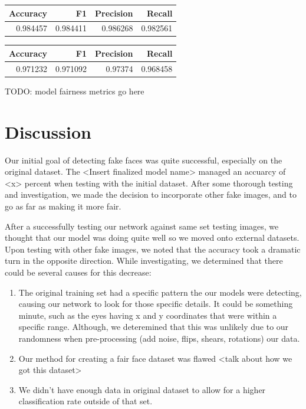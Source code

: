 \documentclass[11pt, letterpaper]{article}
\newenvironment{Figure}
  {\par\medskip\noindent\minipage{\linewidth}}
  {\endminipage\par\medskip}
\providecommand{\tightlist}{%
  \setlength{\itemsep}{0pt}\setlength{\parskip}{0pt}
}
\begin{document}
\begin{multicols}{2}
  \begin{Figure}
    \centering
    \label{vgg10-combined-metrics}
    \begin{tabular}{rrrr}
    \toprule
    Accuracy &        F1 &  Precision &    Recall \\
    \midrule
    0.984457 &  0.984411 &   0.986268 &  0.982561 \\
    \bottomrule
    \end{tabular}
  \end{Figure}

  \begin{Figure}
    \centering
    \label{vgg10-combined-fakefaces-metrics}
    \begin{tabular}{rrrr}
    \toprule
     Accuracy &        F1 &  Precision &    Recall \\
    \midrule
     0.971232 &  0.971092 &    0.97374 &  0.968458 \\
    \bottomrule
    \end{tabular}
    \end{Figure}    

  TODO: model fairness metrics go here

  \section{Discussion}
  Our initial goal of detecting fake faces was quite successful, especially on
  the original dataset. The <Insert finalized model name> managed an accuarcy of
  <x> percent when testing with the initial dataset. After some thorough testing
  and investigation, we made the decision to incorporate other fake images, and
  to go as far as making it more fair. 
	
  After a successfully testing our network against same set testing images, we
  thought that our model was doing quite well so we moved onto external
  datasets. Upon testing with other fake images, we noted that the accuracy took
  a dramatic turn in the opposite direction. While investigating, we determined
  that there could be several causes for this decrease:
	
  \begin{enumerate}
    \tightlist
  		\item The original training set had a specific pattern the our models were
  		detecting, causing our network to look for those specific details. It
  		could be something minute, such as the eyes having x and y coordinates
  		that were within a specific range. Although, we deteremined that this was
  		unlikely due to our randomness when pre-processing (add noise, flips,
  		shears, rotations) our data. 
  		\item Our method for creating a fair face dataset was flawed <talk about
  		how we got this dataset>
  		\item We didn't have enough data in original dataset to allow for a higher
  		classification rate outside of that set. 
	\end{enumerate}
	

\end{multicols}
\end{document}

